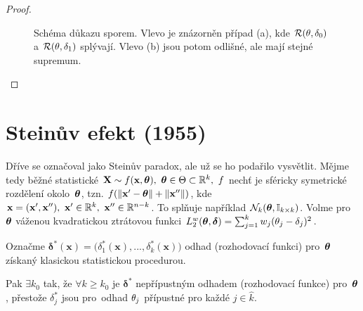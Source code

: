 \begin{theorem}["Obrátka"]
\begin{proof}
\begin{enumerate}[1)]
		\begin{figure}[h]
		\centering
		\caption{Schéma důkazu sporem. Vlevo je znázorněn případ (a), kde $ \mathcal{R}(\theta,\delta_0)$ a $ \mathcal{R}(\theta,\delta_1)$ splývají. Vlevo (b) jsou potom odlišné, ale mají stejné supremum.}
		\label{fig:26-4}
	\end{figure}
	\end{enumerate}
	\end{proof}
\end{theorem}

\section{Steinův efekt (1955)}
Dříve se označoval jako Steinův paradox, ale už se ho podařilo vysvětlit.
Mějme tedy běžné statistické $\textbf{X}\sim f(\textbf{x},\boldsymbol{\theta}),~\boldsymbol{\theta}\in\Theta\subset\mathbb{R}^k,~f$ nechť je sféricky symetrické rozdělení okolo~$\boldsymbol{\theta}$, tzn. $f(\left\|\textbf{x}'-\boldsymbol{\theta}\right\|+\left\|\textbf{x}''\right\|)$, kde $\textbf{x}=(\textbf{x}',\textbf{x}''),~\textbf{x}'\in\mathbb{R}^k,~\textbf{x}''\in\mathbb{R}^{n-k}$. To splňuje například $\mathcal{N}_k(\boldsymbol{\theta},\mathbb{I}_{k\times k})$. Volme pro~$\boldsymbol{\theta}$ váženou kvadratickou ztrátovou funkci $L_2^w(\boldsymbol{\theta},\boldsymbol{\delta})=\sum_{j=1}^k w_j(\theta_j-\delta_j)^2$. 
	
Označme $\boldsymbol{\delta}^\ast(\textbf{x})=\big(\delta_1^\ast(\textbf{x}),...,\delta_k^\ast(\textbf{x})\big)$ odhad (rozhodovací funkci) pro~$\boldsymbol{\theta}$ získaný klasickou statistickou procedurou. 

Pak $\exists k_0$ tak, že $\forall k\geq k_0$ je $\boldsymbol{\delta}^\ast$ nepřípustným odhadem (rozhodovací funkce) pro~$\boldsymbol{\theta}$, přestože $\delta_j^\ast$ jsou pro~odhad $\theta_j$ přípustné pro každé $ j\in\widehat{k}$.

